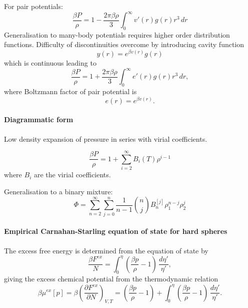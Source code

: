 For pair potentials:
\begin{equation}
  \frac{\beta P}{\rho} =
  1 - \frac{2 \pi \beta \rho}{3}
  \int_0^\infty v'(r) g(r) r^3 \, dr
\end{equation}
Generalisation to many-body potentials requires higher order distribution functions.
Difficulty of discontinuities overcome by introducing cavity function
\begin{equation}
  y(r) = e^{\beta v(r)} g(r)
\end{equation}
which is continuous leading to
\begin{equation}
  \frac{\beta P}{\rho} =
  1 + \frac{2 \pi \beta \rho}{3}
  \int_0^\infty e'(r) g(r) r^3 \, dr,
\end{equation}
where Boltzmann factor of pair potential is
\begin{equation}
  e(r) = e^{\beta v(r)}.
\end{equation}

\paragraph{Diagrammatic form}
Low density expansion of pressure in series with virial coefficients.

\begin{equation}
  \frac{\beta P}{\rho} =
  1 + \sum_{i=2}^\infty B_i(T) \rho^{i-1}
\end{equation}
where $B_i$ are the virial coefficients.

Generalisation to a binary mixture: \cite{Hansen-Goos2014}
\begin{equation}
  \Phi = \sum_{n=2}^\infty \sum_{j=0}^{n}
  \frac{1}{n-1} {n \choose j} B_n^{[j]} \rho_1^{n-j} \rho_2^j
\end{equation}

\paragraph{Empirical Carnahan-Starling equation of state for hard spheres}

The excess free energy is determined from the equation of state by
\begin{equation}
  \frac{\beta F^{ex}}{N}
  = \int_0^\eta \left( \frac{\beta p}{\rho} - 1 \right) \, \frac{d\eta'}{\eta'},
\end{equation}
giving the excess chemical potential from the thermodynamic relation
\begin{equation}\label{eq:chemical-potential}
  \beta \mu^{ex}[p]
  = \beta \left( \frac{\partial F^{ex}}{\partial N} \right)_{V,T}
  = \left( \frac{\beta p}{\rho} - 1 \right)
  + \int_0^\eta \left( \frac{\beta p}{\rho} - 1 \right) \, \frac{d\eta'}{\eta'}.
\end{equation}

